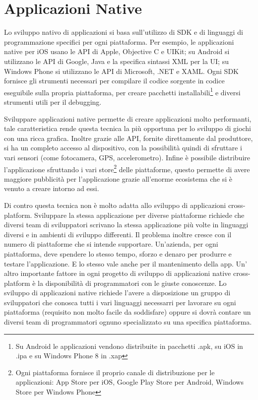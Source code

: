 	\section{Applicazioni Native}
	\label{sec:nativapp}
		Lo sviluppo nativo di applicazioni si basa sull'utilizzo di SDK e di 
		linguaggi di programmazione specifici per ogni piattaforma. Per esempio, 
		le applicazioni native per iOS usano le API di Apple, Objective C e 
		UIKit; su Android si utilizzano le API di Google, Java e la specifica 
		sintassi XML per la UI; su Windows Phone si utilizzano le API di 
		Microsoft, .NET e XAML. Ogni SDK fornisce gli strumenti necessari per 
		compilare il codice sorgente in codice eseguibile sulla propria 
		piattaforma, per creare pacchetti installabili\footnote{Su Android le 
		applicazioni vendono distribuite in pacchetti .apk, su iOS in .ipa e su 
		Windows Phone 8 in .xap} e diversi strumenti utili per il debugging.

		Sviluppare applicazioni native permette di creare applicazioni molto 
		performanti, tale caratteristica rende questa tecnica la più opportuna 
		per lo sviluppo di giochi con una ricca grafica. Inoltre grazie alle 
		API, fornite direttamente dal produttore, si ha un completo accesso al 
		dispositivo, con la possibilità quindi di sfruttare i vari sensori 
		(come fotocamera, GPS, accelerometro). Infine è possibile distribuire 
		l'applicazione sfruttando i vari store\footnote{Ogni piattaforma 
		fornisce il proprio canale di distribuzione per le applicazioni: 
		App Store per iOS, Google Play Store per Android, Windows Store per 
		Windows Phone} delle piattaforme, questo permette di avere maggiore 
		pubblicità per l'applicazione grazie all'enorme ecosistema che si è 
		venuto a creare intorno ad essi.

		Di contro questa tecnica non è molto adatta allo sviluppo di 
		applicazioni cross-platform. Sviluppare la stessa applicazione per 
		diverse piattaforme richiede che diversi team di sviluppatori scrivano 
		la stessa applicazione più volte in linguaggi diversi e in ambienti di 
		sviluppo differenti. Il problema inoltre cresce con il numero di 
		piattaforme che si intende supportare. Un'azienda, per ogni piattaforma, 
		deve spendere lo stesso tempo, sforzo e denaro per produrre e testare 
		l'applicazione. E lo stesso vale anche per il mantenimento della app. 
		Un' altro importante fattore in ogni progetto di sviluppo di 
		applicazioni native cross-platform è la disponibilità di programmatori 
		con le giuste conoscenze. Lo sviluppo di applicazioni native richiede 
		l'avere a disposizione un gruppo di sviluppatori che conosca tutti i 
		vari linguaggi necessarri per lavorare su ogni piattaforma (requisito 
		non	molto facile da soddisfare) oppure si dovrà contare un diversi team 
		di programmatori ognuno specializzato su una specifica piattaforma.
		
